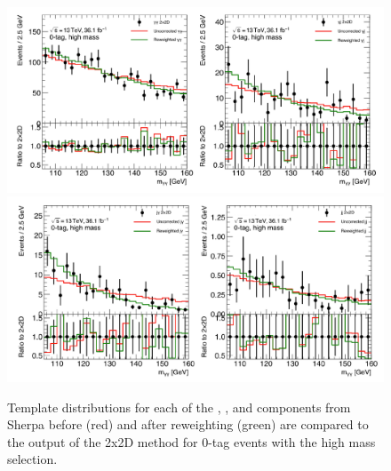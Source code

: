 \begin{figure}[!htbp]
  \centering
  \includegraphics[width=\textwidth]{chapters/chapter5_yybb/images/2x2d/high_mass_1_clean.pdf}\\
  \includegraphics[width=\textwidth]{chapters/chapter5_yybb/images/2x2d/high_mass_2_clean.pdf}
  \caption[Template distributions for each of the \yy, \yj, \jy and \jj components before and after reweighting compared to the output of the 2x2D method for 0-tag events with the high mass selection]{Template distributions for each of the \yy, \yj, \jy and \jj components from Sherpa before (red) and after reweighting (green) are compared to the output of the 2x2D method for 0-tag events with the high mass selection.
    \label{fig:2x2D_templates_highMass}}
\end{figure}

